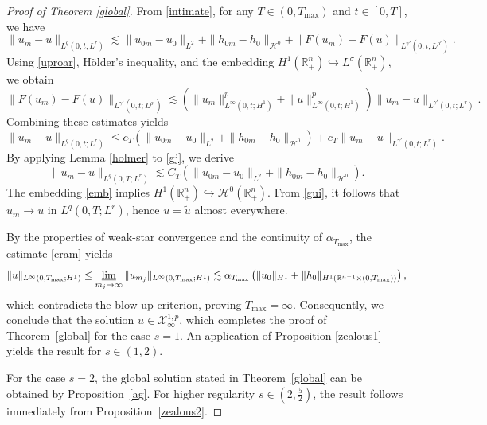 \documentclass[preprint,compress,12pt]{elsarticle}
\numberwithin{equation}{section}
\begin{document}
\begin{proof}[Proof of Theorem \ref{global}]
	From \eqref{intimate},
	for any $T\in(0,T_{\max})$ and $t\in[0,T]$, we have
	\begin{equation*}
		\|u_{m}-u\|_{L^{q}(0,t;L^{r})}\lesssim \|u_{0m}-u_{0}\|_{L^{2}}+\|h_{0m}-h_{0}\|_{\mathcal{H}^{0}}+\|F(u_{m})-F(u)\|_{L^{\gamma'}(0,t;L^{\rho'})}.
	\end{equation*}
	Using \eqref{uproar}, H\"{o}lder's inequality,  and the embedding $H^{1}(\mathbb{R}^{n}_{+})\hookrightarrow L^{\sigma}(\mathbb{R}^{n}_{+})$, we obtain
	\begin{equation*}
		\|F(u_{m})-F(u)\|_{L^{\gamma'}(0,t;L^{\rho'})}\lesssim	\left(\|u_{m}\|_{L^{\infty}(0,t;H^{1})}^{p}+\|u\|_{L^{\infty}(0,t;H^{1})}^{p}\right) \|u_{m}-u\|_{L^{\gamma'}(0,t;L^{r})}.
	\end{equation*}
	Combining these estimates yields
	\begin{equation}\label{gj}
		\|u_{m}-u\|_{L^{q}(0,t;L^{r})}\leq c_{T}\left( \|u_{0m}-u_{0}\|_{L^{2}}+\|h_{0m}-h_{0}\|_{\mathcal{H}^{0}}\right)+ c_{T}\|u_{m}-u\|_{L^{\gamma'}(0,t;L^{r})}.
	\end{equation}
	By applying Lemma \ref{holmer} to \eqref{gj}, we derive
	\begin{equation}\label{gui}
		\|u_{m}-u\|_{L^{q}(0,T;L^{r})}\lesssim C_{T}  \left(\|u_{0m}-u_{0}\|_{L^{2}}+\|h_{0m}-h_{0}\|_{\mathcal{H}^{0}}\right).
	\end{equation}
	The embedding \eqref{emb} implies $H^{1}(\mathbb{R}^{n}_{+}) \hookrightarrow \mathcal{H}^{0}(\mathbb{R}^{n}_{+})$. From \eqref{gui}, it follows that $u_{m}\rightarrow u$ in $L^{q}(0,T;L^{r})$, hence $u = \tilde{u}$ almost everywhere.
	
	By the properties of weak-star convergence and the continuity of $\alpha_{T_{\max}}$, the estimate \eqref{cram} yields
	\begin{equation*}
		\|u\|_{L^{\infty}(0,T_{\max};H^{1})}
		\leq \varliminf_{m_{j}\rightarrow\infty}\|u_{m_{j}}\|_{L^{\infty}(0,T_{\max};H^{1})}
		\lesssim \alpha_{T_{\max}}\left(\|u_{0}\|_{H^{1}}+\|h_{0}\|_{H^{1}(\mathbb{R}^{n-1}\times(0,T_{\max}))}\right),
	\end{equation*}
	which contradicts the blow-up criterion, proving $T_{\max}=\infty$.
	Consequently, we conclude that the solution $u \in \mathscr{X}^{1,p}_\infty$, which completes the proof of Theorem~\ref{global} for the case $s=1$. An application of Proposition \ref{zealous1} yields the result for $s\in(1,2)$.
	
	For the case $s = 2$, the global solution stated in Theorem~\ref{global} can be obtained by Proposition~\ref{ag}. For higher regularity $s\in\left(2,\frac{5}{2}\right)$, the result follows immediately from Proposition~\ref{zealous2}.
\end{proof}
\end{document}
